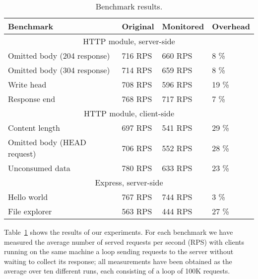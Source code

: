 \begin{table}[ht]
  \begin{tabular}{|l|l|l|l|}
    \hline
    \textbf{Benchmark} &
    \textbf{Original} &
    \textbf{Monitored} &
    \textbf{Overhead} \\
    \hline
    \multicolumn{4}{|c|}{HTTP module, server-side}\\
    \hline

    Omitted body (204 response)&
    716 RPS &
    660 RPS &
    8 \% \\

    Omitted body (304 response)&
    714 RPS &
    659 RPS &
    8 \% \\

    Write head &
    708 RPS &
    596 RPS &
    19 \% \\

    Response end &
    768 RPS &
    717 RPS &
    7 \% \\

    \hline

    \multicolumn{4}{|c|}{HTTP module, client-side}\\
    \hline

    Content length &
    697 RPS &
    541 RPS &
    29 \% \\

    Omitted body (HEAD request)&
    706 RPS &
    552 RPS &
    28 \% \\

    Unconsumed data &
     780 RPS &
     633 RPS &
     23 \% \\

     \hline
    \multicolumn{4}{|c|}{Express, server-side}\\
    \hline
    Hello world &
    767 RPS &
    744 RPS &
    3 \% \\

    File explorer &
    563 RPS &
    444 RPS &
    27 \%\\

    \hline
  \end{tabular}
  \caption{Benchmark results.}
  \label{table}
\end{table}
\vspace{-1em}
Table~\ref{table} shows the results of our experiments.
For each benchmark we have measured the average number of served requests per second (RPS) with clients running on the same machine a loop sending requests to the server without waiting to collect its response;
all measurements have been obtained as the average over ten different runs, each consisting of a loop of 100K requests.

